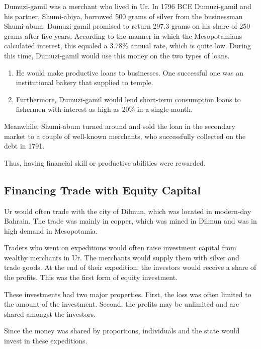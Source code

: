 \documentclass{article}
\begin{document}
    \begin{example}
      Dumuzi-gamil was a merchant who lived in Ur. In 1796 BCE Dumuzi-gamil and his partner, Shumi-abiya, borrowed 500 grams of silver from the businessman Shumi-abum. Dumuzi-gamil promised to return 297.3 grams on his share of 250 grams after five years. According to the manner in which the Mesopotamians calculated interest, this equaled a 3.78\% annual rate, which is quite low. During this time, Dumuzi-gamil would use this money on the two types of loans. 
      \begin{enumerate}
        \item He would make productive loans to businesses. One successful one was an institutional bakery that supplied to temple. 
        \item Furthermore, Dumuzi-gamil would lend short-term consumption loans to fishermen with interest as high as $20\%$ in a single month. 
      \end{enumerate}
      Meanwhile, Shumi-abum turned around and sold the loan in the secondary market to a couple of well-known merchants, who successfully collected on the debt in 1791.
    \end{example}

    Thus, having financial skill or productive abilities were rewarded. 

  \subsection{Financing Trade with Equity Capital}

    Ur would often trade with the city of Dilmun, which was located in modern-day Bahrain. The trade was mainly in copper, which was mined in Dilmun and was in high demand in Mesopotamia. 

    \begin{finance}
      Traders who went on expeditions would often raise investment capital from wealthy merchants in Ur. The merchants would supply them with silver and trade goods. At the end of their expedition, the investors would receive a share of the profits. This was the first form of equity investment.
    \end{finance}

    These investments had two major properties. First, the loss was often limited to the amount of the investment. Second, the profits may be unlimited and are shared amongst the investors. 

    Since the money was shared by proportions, individuals and the state would invest in these expeditions. 
\end{document}
